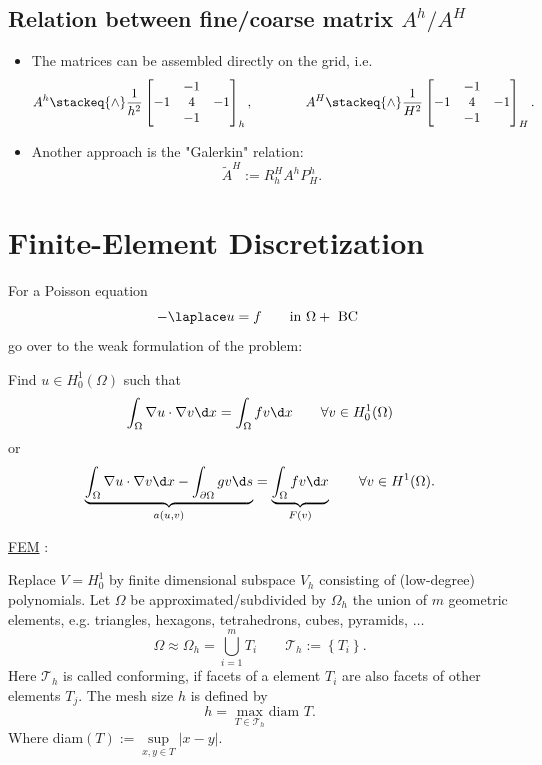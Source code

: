 \subsection{Relation between fine/coarse matrix $A^{h} / A^{H}$}%
\label{sec:Relation between fine/coarse matrix $A^{h} / A^{H}$}

\begin{itemize}
	\item The matrices can be assembled directly on the grid, i.e.
		\[
			A^{h} \stackeq{\wedge} \frac{1}{h^{2}}\begin{bmatrix}
			& -1 & \\
				-1 & 4 & -1 \\
				   & -1 & 
			\end{bmatrix}_{h},
			\qquad\qquad
			A^{H} \stackeq{\wedge} \frac{1}{H^{2}}\begin{bmatrix}
			& -1 & \\
				-1 & 4 & -1 \\
				& -1 & 
			\end{bmatrix}_{H}
		.\] 

	\item Another approach is the "Galerkin" relation:
		\[
		\tilde{A}^{H}:=R_{h}^{H}A^{h}P_{H}^{h}
		.\] 
\end{itemize}

\section{Finite-Element Discretization}%
\label{sec:Finite-Element Discretization}

For a Poisson equation
\[
- \laplace u = f \qquad \text{in }\Omega + \text{ BC }
\] 
go over to the weak formulation of the problem:

Find $u \in H_{0}^{1}(\Omega)$ such that
\[
	\int_{\Omega} \nabla u \cdot \nabla v \d x = \int_{\Omega} fv \d x \qquad \forall v \in H_{0}^{1}(\Omega )
\] 
or
\[
	\underbrace{ \int_{\Omega }\nabla u \cdot \nabla v \d x - \int_{\partial \Omega }gv \d s}_{a(u,v)} = \underbrace{ \int_{\Omega }fv \d x}_{F(v)} \qquad \forall v \in H^{1}(\Omega )
.\] 

\underline{FEM} :

Replace $V=H_{0}^{1}$ by finite dimensional subspace $V_{h}$ consisting of (low-degree) polynomials.
Let $\Omega $ be approximated/subdivided by $\Omega _{h}$ the union of $m$ geometric elements, e.g. triangles, hexagons, tetrahedrons, cubes, pyramids, $\ldots $
\[
\Omega \approx \Omega _{h} = \bigcup_{i=1}^{m}T_{i} \qquad \mathcal{T}_{h} := \left\{ T_{i} \right\} 
.\] 
Here $\mathcal{T}_{h}$ is called conforming, if facets of a element $T_{i}$ are also facets of other elements $T_{j}$.
The mesh size $h$ is defined by
\[
h = \max\limits_{T \in\mathcal{T}_{h}} \text{diam } T
.\] 
Where diam$(T):=\underset{x,y \in T }{\sup} |x-y|$.

